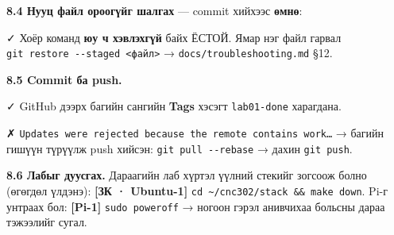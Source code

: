 \begin{Shaded}
\begin{Highlighting}[]
\end{Highlighting}
\end{Shaded}

\textbf{8.4 Нууц файл ороогүйг шалгах} --- commit хийхээс \textbf{өмнө}:

\begin{Shaded}
\begin{Highlighting}[]
\KeywordTok{|} 
\KeywordTok{|} 
\end{Highlighting}
\end{Shaded}

✓ Хоёр команд \textbf{юу ч хэвлэхгүй} байх ЁСТОЙ. Ямар нэг файл гарвал \texttt{git\ restore\ -\/\allowbreak{}-staged\ \textless{}файл\textgreater{}} → \texttt{docs/\allowbreak{}troubleshooting.\allowbreak{}md} §12.

\textbf{8.5 Commit ба push.}

\begin{Shaded}
\begin{Highlighting}[]
\end{Highlighting}
\end{Shaded}

✓ GitHub дээрх багийн сангийн \textbf{Tags} хэсэгт \texttt{lab01-done} харагдана.

✗ \texttt{Updates\ were\ rejected\ because\ the\ remote\ contains\ work\ldots{}} → багийн гишүүн түрүүлж push хийсэн: \texttt{git\ pull\ -\/\allowbreak{}-rebase} → дахин \texttt{git\ push}.

\textbf{8.6 Лабыг дуусгах.} Дараагийн лаб хүртэл үүлний стекийг зогсоож болно (өгөгдөл үлдэнэ): \textbf{{[}ЗК · Ubuntu-1{]}} \texttt{cd\ \textasciitilde{}/cnc302/stack\ \&\&\ make\ down}. Pi-г унтраах бол: \textbf{{[}Pi-1{]}} \texttt{sudo\ poweroff} → ногоон гэрэл анивчихаа больсны дараа тэжээлийг сугал.

